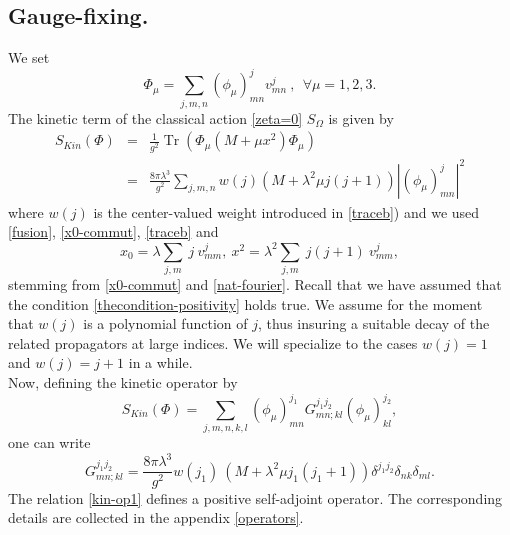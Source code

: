 \documentclass[a4paper,11pt,twoside]{article}
\numberwithin{equation}{section}
\DeclareMathOperator{\tr}{Tr}
\theoremstyle{nonumberplain}
\newcounter{and}
\begin{document}
\subsection{Gauge-fixing.}\label{subsection31}

We set%
%
\begin{equation}
\Phi_\mu = \sum_{j,m,n} (\phi_\mu)^j_{mn} v^j_{mn} \ , \ \ \forall \mu=1,2,3.
\end{equation}
%
The kinetic term of the classical action \eqref{zeta=0} $S_\Omega$ is given by%
%
\begin{eqnarray}
S_{Kin}(\Phi) &=& \frac{1}{g^2} \tr( \Phi_\mu (M+\mu x^2) \Phi_\mu)\label{skin} \\
&=& \frac{8\pi\lambda^3}{g^2} \sum_{j,m,n} w(j) (M+\lambda^2\mu j(j+1)) |(\phi_\mu)^j_{mn}|^2 \label{skin-explicit}
\end{eqnarray}
%
where $w(j)$ is the center-valued weight introduced in \eqref{traceb}) and we used \eqref{fusion}, \eqref{x0-commut}, \eqref{traceb} and 
\begin{equation}
x_0 = \lambda\sum_{j,m} \ j \ v^j_{mm},\ x^2 = \lambda^2\sum_{j,m} \ j(j+1) \ v^j_{mm},\label{relation-apendix1}
\end{equation}
stemming from \eqref{x0-commut} and \eqref{nat-fourier}. Recall that we have assumed that the condition \eqref{thecondition-positivity} holds true. We assume for the moment that $w(j)$ is a polynomial function of $j$, thus insuring a suitable decay of the related propagators at large indices. We will specialize to the cases $w(j)=1$ and $w(j)=j+1$ in a while.\\
Now, defining the kinetic operator by
\begin{equation*}
S_{Kin}(\Phi)=\sum_{j,m,n,k,l}(\phi_\mu)^{j_1}_{mn}G^{j_1j_2}_{mn;kl}(\phi_\mu)^{j_2}_{kl},
\end{equation*}
one can write 
%
\begin{equation}
G^{j_1j_2}_{mn;kl} = \frac{8\pi\lambda^3}{g^2} w(j_1) \ \left(M+\lambda^2\mu j_1(j_1+1)\right) \delta^{j_1j_2} \delta_{nk} \delta_{ml}.\label{kin-op1}
\end{equation}
The relation \eqref{kin-op1} defines a positive self-adjoint operator. The corresponding details are collected in the appendix \ref{operators}.\par 
\end{document}
